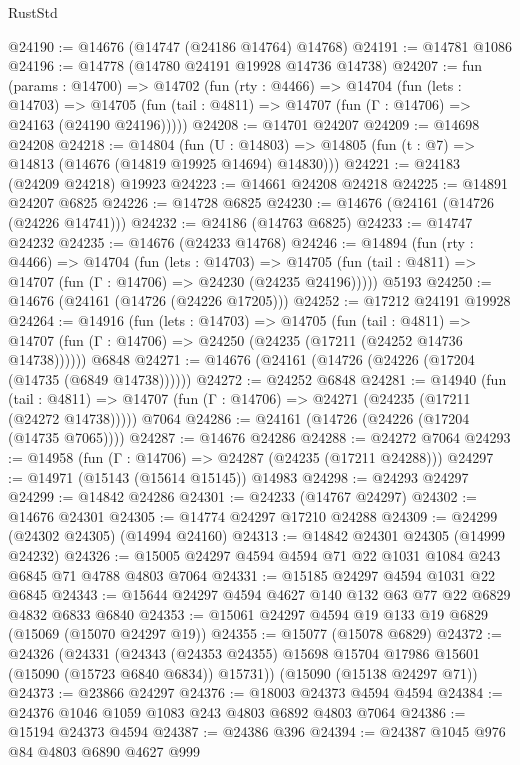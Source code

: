 \begin{lexlean}{RustStd}
\begin{coremodule}
@24190 := @14676 (@14747 (@24186 @14764) @14768)
@24191 := @14781 @1086
@24196 := @14778 (@14780 @24191 @19928 @14736 @14738)
@24207 := fun (params : @14700) =>
  @14702
    (fun (rty : @4466) =>
    @14704
      (fun (lets : @14703) =>
      @14705 (fun (tail : @4811) => @14707 (fun (Γ : @14706) => @24163 (@24190 @24196)))))
@24208 := @14701 @24207
@24209 := @14698 @24208
@24218 := @14804
    (fun (U : @14803) => @14805 (fun (t : @7) => @14813 (@14676 (@14819 @19925 @14694) @14830)))
@24221 := @24183 (@24209 @24218) @19923
@24223 := @14661 @24208 @24218
@24225 := @14891 @24207 @6825
@24226 := @14728 @6825
@24230 := @14676 (@24161 (@14726 (@24226 @14741)))
@24232 := @24186 (@14763 @6825)
@24233 := @14747 @24232
@24235 := @14676 (@24233 @14768)
@24246 := @14894
    (fun (rty : @4466) =>
    @14704
      (fun (lets : @14703) =>
      @14705 (fun (tail : @4811) => @14707 (fun (Γ : @14706) => @24230 (@24235 @24196)))))
    @5193
@24250 := @14676 (@24161 (@14726 (@24226 @17205)))
@24252 := @17212 @24191 @19928
@24264 := @14916
    (fun (lets : @14703) =>
    @14705
      (fun (tail : @4811) =>
      @14707 (fun (Γ : @14706) => @24250 (@24235 (@17211 (@24252 @14736 @14738))))))
    @6848
@24271 := @14676 (@24161 (@14726 (@24226 (@17204 (@14735 (@6849 @14738))))))
@24272 := @24252 @6848
@24281 := @14940
    (fun (tail : @4811) => @14707 (fun (Γ : @14706) => @24271 (@24235 (@17211 (@24272 @14738)))))
    @7064
@24286 := @24161 (@14726 (@24226 (@17204 (@14735 @7065))))
@24287 := @14676 @24286
@24288 := @24272 @7064
@24293 := @14958 (fun (Γ : @14706) => @24287 (@24235 (@17211 @24288)))
@24297 := @14971 (@15143 (@15614 @15145)) @14983
@24298 := @24293 @24297
@24299 := @14842 @24286
@24301 := @24233 (@14767 @24297)
@24302 := @14676 @24301
@24305 := @14774 @24297 @17210 @24288
@24309 := @24299 (@24302 @24305) (@14994 @24160)
@24313 := @14842 @24301 @24305 (@14999 @24232)
@24326 := @15005 @24297 @4594 @4594 @71 @22 @1031 @1084 @243 @6845 @71 @4788 @4803 @7064
@24331 := @15185 @24297 @4594 @1031 @22 @6845
@24343 := @15644 @24297 @4594 @4627 @140 @132 @63 @77 @22 @6829 @4832 @6833 @6840
@24353 := @15061 @24297 @4594 @19 @133 @19 @6829 (@15069 (@15070 @24297 @19))
@24355 := @15077 (@15078 @6829)
@24372 := @24326
    (@24331
      (@24343 (@24353 @24355) @15698 @15704 @17986 @15601 (@15090 (@15723 @6840 @6834)) @15731))
    (@15090 (@15138 @24297 @71))
@24373 := @23866 @24297
@24376 := @18003 @24373 @4594 @4594
@24384 := @24376 @1046 @1059 @1083 @243 @4803 @6892 @4803 @7064
@24386 := @15194 @24373 @4594
@24387 := @24386 @396
@24394 := @24387 @1045 @976 @84 @4803 @6890 @4627 @999

\end{coremodule}
\end{lexlean}
